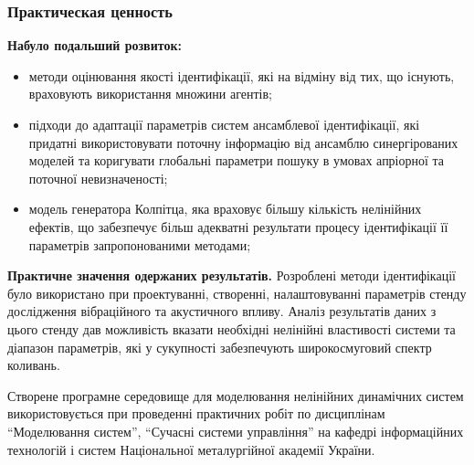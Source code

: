 \documentclass[14pt,handout,utf8]{beamer}
\begin{document}

\begin{frame}
  \frametitle{Практическая ценность}

  \noindent
  \textbf{ Набуло подальший розвиток:}
  \begin{itemize}

    \item
      методи оцінювання якості ідентифікації,
      які на відміну від тих, що існують,
      враховують використання множини агентів;

    \item
      підходи до адаптації параметрів систем
      ансамблевої ідентифікації, які придатні використовувати поточну
      інформацію від ансамблю синергірованих моделей та коригувати глобальні
      параметри пошуку в умовах апріорної та поточної невизначеності;

    \item
      модель генератора Колпітца, яка враховує
      більшу кількість нелінійних ефектів,
      що забезпечує більш адекватні результати процесу
      ідентифікації її параметрів запропонованими методами;
  \end{itemize}


\textbf{Практичне значення одержаних результатів.}
Розроблені методи ідентифікації було використано
при проектуванні, створенні, налаштовуванні параметрів
стенду дослідження вібраційного та акустичного впливу.
Аналіз результатів даних з цього стенду
дав можливість вказати необхідні нелінійні властивості системи
та діапазон параметрів, які у сукупності
забезпечують широкосмуговий спектр коливань.

Створене програмне середовище для моделювання нелінійних динамічних систем
використовується при проведенні практичних робіт по дисциплінам
``Моделювання систем'',
``Сучасні системи управління'' на кафедрі інформаційних технологій
і систем Національної металургійної академії України.

\end{frame}





\end{document}
